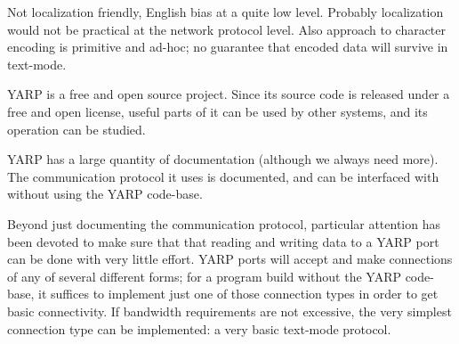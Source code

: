Not localization friendly, English bias at a quite low level.
Probably localization would not be practical at the network
protocol level.  Also approach to character encoding is
primitive and ad-hoc; no guarantee that encoded data
will survive in text-mode.



YARP is a free and open source project.  Since its source code is
released under a free and open license, useful parts of it can be used
by other systems, and its operation can be studied.

YARP has a large quantity of documentation (although we always need
more).  The communication protocol it uses is documented, and can be
interfaced with without using the YARP code-base.

Beyond just documenting the communication protocol, particular attention
has been devoted to make sure that that reading and writing data to a
YARP port can be done with very little effort.  YARP ports will 
accept and make connections of any of several different forms;
for a program build without the YARP code-base, it suffices
to implement just one of those connection types in order to
get basic connectivity.  If bandwidth requirements are not
excessive, the very simplest connection type can be implemented:
a very basic text-mode protocol.

